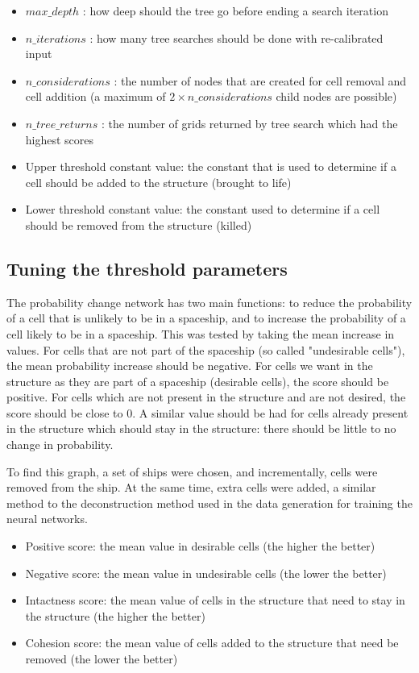 \documentclass{l4proj}
\begin{document}
\begin{itemize}
    \item $max\_depth$ : how deep should the tree go before ending a search iteration
    \item $n\_iterations$ : how many tree searches should be done with re-calibrated input
    \item $n\_considerations$ : the number of nodes that are created for cell removal and cell addition (a maximum of $2 \times n\_considerations$ child nodes are possible)
    \item $n\_tree\_returns$ : the number of grids returned by tree search which had the highest scores
    \item Upper threshold constant value: the constant that is used to determine if a cell should be added to the structure (brought to life)
    \item Lower threshold constant value: the constant used to determine if a cell should be removed from the structure (killed)
\end{itemize} 

\subsection{Tuning the threshold parameters}

The probability change network has two main functions: to reduce the probability of a cell that is unlikely to be in a spaceship, and to increase the probability of a cell likely to be in a spaceship. This was tested by taking the mean increase in values. For cells that are not part of the spaceship (so called "undesirable cells"), the mean probability increase should be negative. For cells we want in the structure as they are part of a spaceship (desirable cells), the score should be positive. For cells which are not present in the structure and are not desired, the score should be close to 0. A similar value should be had for cells already present in the structure which should stay in the structure: there should be little to no change in probability. 

To find this graph, a set of ships were chosen, and incrementally, cells were removed from the ship. At the same time, extra cells were added, a similar method to the deconstruction method used in the data generation for training the neural networks.

\begin{itemize}
    \item Positive score: the mean value in desirable cells (the higher the better)
    \item Negative score: the mean value in undesirable cells (the lower the better)
    \item Intactness score: the mean value of cells in the structure that need to stay in the structure (the higher the better)
    \item Cohesion score: the mean value of cells added to the structure that need be removed (the lower the better)
\end{itemize}
\end{document}
